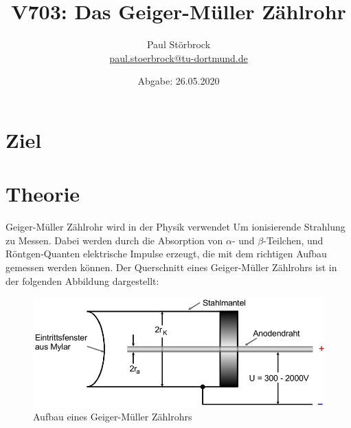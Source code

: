 
\usepackage{tikz}

\newcommand*\circled[1]{\tikz[baseline=(char.base)]{
            \node[shape=circle,draw,inner sep=2pt] (char) {#1};}}


    \title{V703: Das Geiger-Müller Zählrohr}
    \author{  
    Paul Störbrock\\
    \texorpdfstring{\href{mailto:paul.stoerbrock@tu-dortmund.de}{paul.stoerbrock@tu-dortmund.de}}{}
    }
    \date{Abgabe: 26.05.2020\vspace{-4ex}}
\maketitle
    
\newpage
\tableofcontents
\newpage

\setcounter{page}{1}

\section{Ziel}

\section{Theorie}

    \justifying Geiger-Müller Zählrohr wird in der Physik verwendet Um
    ionisierende Strahlung zu Messen. Dabei werden durch die Absorption von $\alpha$- und
    $\beta$-Teilchen, und Röntgen-Quanten elektrische Impulse erzeugt, die mit dem 
    richtigen Aufbau gemessen werden können. Der Querschnitt eines Geiger-Müller Zählrohrs
    ist in der folgenden Abbildung dargestellt:

    \begin{figure}[H]
        \centering
        \includegraphics[width=\linewidth]{images/Querschnitt.jpg}
        \caption{Aufbau eines Geiger-Müller Zählrohrs \cite{V703}}
        \label{fig:1}
    \end{figure}

